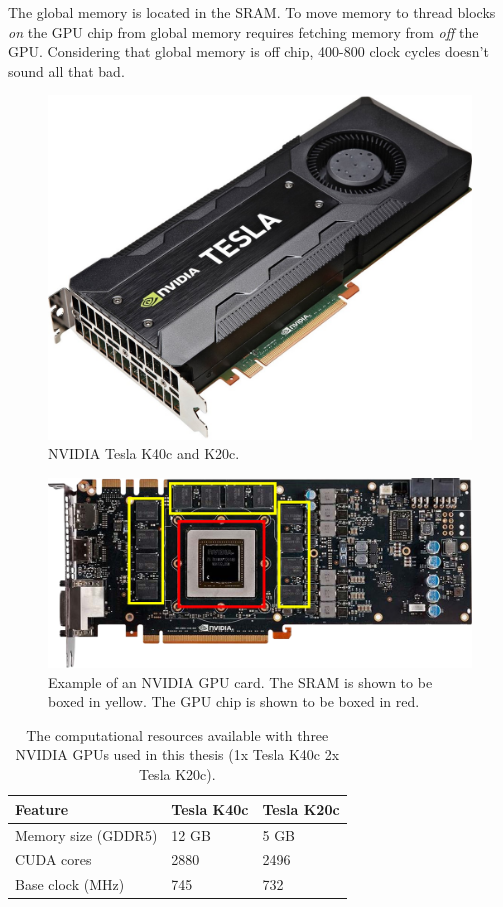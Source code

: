 The global memory is located in the SRAM.
To move memory to thread blocks \textit{on} the GPU chip from global memory requires fetching memory from \textit{off} the GPU.
Considering that global memory is off chip, 400-800 clock cycles doesn't sound all that bad.
\begin{figure}
	\centering\includegraphics[width=5in]{figures/gpu_intro/k40c_k20c.jpg}
	\caption{NVIDIA Tesla K40c and K20c.}
	\label{fig:GPUpicture}
\end{figure}
\begin{figure}
	\centering\includegraphics[width=\textwidth]{figures/gpu_intro/Kepler_box.png}
	\caption{Example of an NVIDIA GPU card. The SRAM is shown to be boxed in yellow. The GPU chip is shown to be boxed in red.}
	\label{fig:GPUarch}
\end{figure}
\begin{table}
\begin{center}
\begin{tabular}{lll}
	\toprule
	Feature 			& Tesla K40c 	& Tesla K20c 	\\ \midrule
	Memory size (GDDR5) & 12 GB 		& 5 GB 			\\
	CUDA cores 			& 2880 			& 2496 			\\
	Base clock (MHz) 	& 745 			& 732 			\\ \bottomrule
\end{tabular}
\end{center}
\caption{The computational resources available with three NVIDIA GPUs used in this thesis (1x Tesla K40c 2x Tesla K20c).}
\label{tab:gpu-resources_jeffs}
\end{table}

